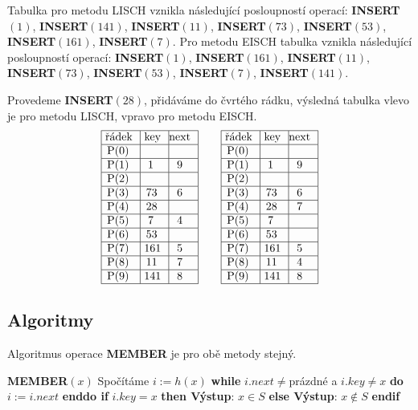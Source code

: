 \documentclass[a4paper,12pt]{article}
\begin{document}
Tabulka pro metodu LISCH vznikla následující posloupností 
operací:\newline 
{\bf INSERT$(1)$}, {\bf INSERT$(141)$}, {\bf INSERT$(11)$}, {\bf INSERT$
(73)$}, 
{\bf INSERT$(53)$},\newline 
{\bf INSERT$(161)$}, {\bf INSERT$(7)$}.\newline 
Pro metodu EISCH tabulka vznikla následující posloupností 
operací:\newline 
{\bf INSERT$(1)$}, {\bf INSERT$(161)$}, {\bf INSERT$(11)$}, {\bf INSERT$
(73)$}, 
{\bf INSERT$(53)$}, {\bf INSERT$(7)$}, {\bf INSERT$(141)$}. 

Provedeme {\bf INSERT$(28)$}, přidáváme do čvrtého rádku, vý\-sled\-ná tabulka vlevo je pro meto\-du 
LISCH, vpravo pro metodu EISCH.
$$\vbox {\hbox{\vtop{\offinterlineskip\halign{\strut\vrule\ # & \vrule\ # & \vrule\hfil# \hfil\vrule\cr\noalign{\hrule}řádek & key & next \hfil\cr\noalign{\hrule}P(0) & &\hfill \cr\noalign{\hrule}P(1) & 1 & 9 \cr\noalign{\hrule}P(2) & &\hfill \cr\noalign{\hrule}P(3) & 73 & 6 \cr\noalign{\hrule}P(4) & 28 &\hfill \cr\noalign{\hrule}P(5) & 7 & 4 \cr\noalign{\hrule}P(6) & 53 &\hfill \cr\noalign{\hrule}P(7) & 161 & 5 \cr\noalign{\hrule}P(8) & 11 & 7 \cr\noalign{\hrule}P(9) & 141 & 8 \cr\noalign{\hrule}}}\qquad\vtop{\offinterlineskip\halign {\strut\vrule\ # & \vrule\ # & \vrule \hfil # \hfil \vrule\cr\noalign{\hrule}řádek & key & next \hfil \cr\noalign{\hrule}P(0) & &\hfill \cr\noalign{\hrule}P(1) & 1 & 9 \cr\noalign{\hrule}P(2) & &\hfill \cr\noalign{\hrule}P(3) & 73 & 6 \cr\noalign{\hrule}P(4) & 28 & 7 \cr\noalign{\hrule}P(5) & 7 & \hfill \cr\noalign{\hrule}P(6) & 53 & \hfill \cr\noalign{\hrule}P(7) & 161 & 5 \cr\noalign{\hrule}P(8) & 11 & 4  \cr\noalign{\hrule}P(9) & 141 & 8 \cr\noalign{\hrule}}}}}$$

\subsection{
Algoritmy
}

Algoritmus operace {\bf MEMBER} je pro obě metody stejný.


{\bf MEMBER$(x)$}\newline 
Spočítáme $i:=h(x)$\newline 
{\bf while} $i.next\ne$prázdné a $i.key\ne x$ {\bf do} $i:=i.
next$ {\bf enddo \newline 
if} $i.key=x$ {\bf then Výstup}: $x\in S$ {\bf else Výstup}: $
x\notin S$ {\bf endif}
\end{document}
